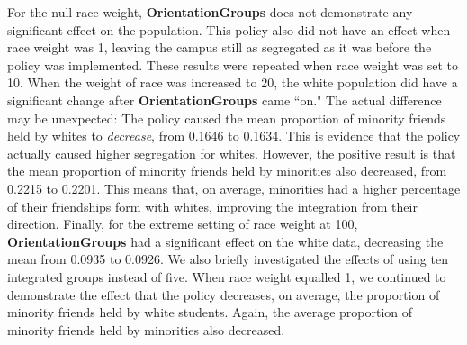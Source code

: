 For the null race weight, {\bf OrientationGroups} does not demonstrate any significant effect on the population. This policy also did not have an effect when race weight was 1, leaving 
the campus still as segregated as it was before the policy was implemented. These results were repeated when race weight was 
set to 10. When the weight of race was increased to 20, the white population did have a significant change after {\bf OrientationGroups} came ``on." The actual difference may 
be unexpected: The policy caused the mean proportion of minority friends held by whites to \emph{decrease}, from 0.1646 to 0.1634. This is evidence that the policy actually caused higher segregation for whites. However, the positive result is that the mean proportion of minority friends held by minorities also decreased, from 0.2215 to 0.2201. This means that, on 
average, minorities had a higher percentage of their friendships form with whites, improving the integration from their direction. Finally, for the extreme setting of race weight at 100, {\bf OrientationGroups} had a significant effect on the white data, decreasing the mean from 0.0935 to 0.0926. We also briefly investigated the effects of using ten integrated groups instead of five. When race weight equalled 1, we continued to demonstrate the effect that the policy decreases, on average, the proportion of minority friends held by white students. Again, the average proportion of minority friends held by minorities also decreased.



